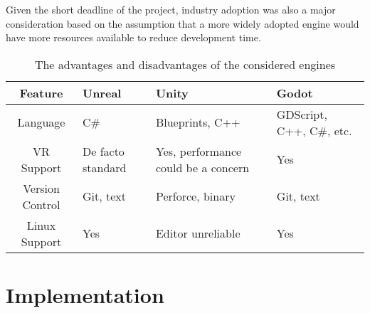 \documentclass[12pt, a4paper]{report}
\begin{document}
Given the short deadline of the project, industry adoption was also a major
consideration based on the assumption that a more widely adopted engine would
have more resources available to reduce development time.

\begin{table}
\caption{The advantages and disadvantages of the considered engines}
\label{table:engine_compare}\begin{tabularx}{\textwidth}{cLLL}\toprule
Feature & Unreal & Unity & Godot \\\midrule

Language & C\# & Blueprints, C++ & GDScript, C++, C\#, etc. \\
VR Support & De facto standard & Yes, performance could be a concern & Yes \\
Version Control & Git, text & Perforce, binary & Git, text \\
Linux Support & Yes & Editor unreliable & Yes \\

\bottomrule\end{tabularx}
\end{table}

\chapter{Implementation}


\todos
\end{document}
